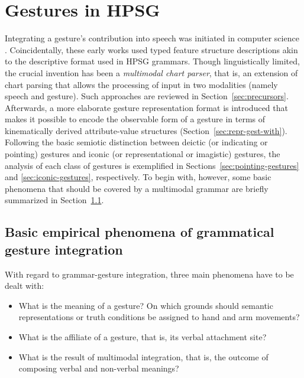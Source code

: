 \documentclass[output=paper
                ,modfonts
                ,nonflat
	        ,collection
	        ,collectionchapter
	        ,collectiontoclongg
 	        ,biblatex
                ,babelshorthands
                ,newtxmath
                ,draftmode
                ,colorlinks, citecolor=brown
]{./langsci/langscibook}
\begin{document}
\section{Gestures in HPSG}
\label{sec:gestures-hpsg}

Integrating a gesture's contribution into speech was initiated in computer science \citep{Bolt:1980}.
%
Coincidentally, these early works used typed feature structure descriptions akin to the descriptive format used in HPSG grammars.
%
Though linguistically limited, the crucial invention has been a \emph{multimodal chart parser},  that is, an extension of chart parsing that allows the processing of input in two modalities (namely speech and gesture).
%
Such approaches are reviewed in Section~\ref{sec:precursors}.
%
Afterwards, a more elaborate gesture representation format is introduced that makes it possible to encode the observable form of a gesture in terms of kinematically derived attribute-value structures (Section~\ref{sec:repr-gest-with}).
%
Following the basic semiotic distinction between deictic (or indicating or pointing) gestures and iconic (or representational or imagistic) gestures, the analysis of each class of gestures is exemplified in Sections~\ref{sec:pointing-gestures} and \ref{sec:iconic-gestures}, respectively.
%
To begin with, however, some basic phenomena that should be covered by a multimodal grammar are briefly summarized in Section~\ref{sec:empir-desid-gramm}.



\subsection{Basic empirical phenomena of grammatical gesture integration}
\label{sec:empir-desid-gramm}

With regard to grammar-gesture integration, three main phenomena have to be dealt with:
%
\begin{itemize}
\item What is the meaning of a gesture? On which grounds should semantic representations or truth conditions be assigned to hand and arm movements?
\item What is the affiliate of a gesture, that is, its verbal attachment site?  
\item What is the result of multimodal integration, that is, the outcome of composing verbal and non-verbal meanings? 
\end{itemize}
\end{document}
